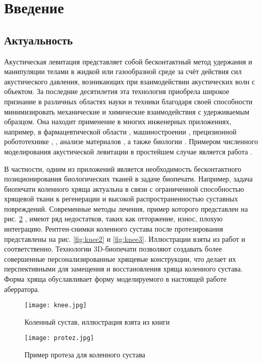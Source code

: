 \section{Введение}
\label{sec:Chapter0} 
\subsection{Актуальность}
Акустическая левитация представляет собой бесконтактный метод удержания и манипуляции телами в жидкой или газообразной среде за счёт действия сил акустического давления, возникающих при взаимодействии акустических волн с объектом. За последние десятилетия эта технология приобрела широкое признание в различных областях науки и техники благодаря своей способности минимизировать механические и химические взаимодействия с удерживаемым образцом. Она находит применение в многих инженерных приложениях, например, в фармацевтической области \cite{appliance_medicine}, машиностроении \cite{appliance_bearings}, прецизионной робототехнике \cite{appliance_robot}, \cite{damping}, анализе материалов \cite{materials}, а также биологии \cite{bio}. Примером численного моделирования акустической левитации в простейшем случае является работа \cite{acoustics_sim}.

В частности, одним из приложений является необходимость бесконтактного позиционирования биологических тканей в задаче биопечати. Например, задача биопечати коленного хряща актуальна в связи с ограниченной способностью хрящевой ткани к регенерации и высокой распространенностью суставных повреждений. Современные методы лечения, пример которого представлен на рис. \ref{fig:protez} \cite{protez}, имеют ряд недостатков, таких как отторжение, износ, плохую интеграцию. Рентген-снимки коленного сустава после протезирования представлены на рис. \ref{fig:knee2} и \ref{fig:knee3}. Иллюстрации взяты из работ \cite{knee2} и \cite{knee3} соответственно. Технологии 3D-биопечати позволяют создавать более совершенные персонализированные хрящевые конструкции, что делает их перспективными для замещения и восстановления хряща коленного сустава. Форма хряща обуславливает форму моделируемого в настоящей работе аберратора.

\begin{figure}[H]
	\centering
	\texttt{[image: knee.jpg]}
	\caption{Коленный сустав, иллюстрация взята из книги \cite{knee1}}
	\label{fig:knee}
\end{figure}

\begin{figure}[H]
	\centering
	\texttt{[image: protez.jpg]}
	\caption{Пример протеза для коленного сустава}
	\label{fig:protez}
\end{figure} 


